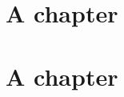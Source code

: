 \documentclass{book}
\begin{document}
\listofalgorithms %

\chapter{A chapter}
\begin{algorithm}\caption{An algorithm}\end{algorithm}
\begin{algorithm}\caption{An algorithm}\end{algorithm}

\chapter{A chapter}
\begin{algorithm}\caption{An algorithm}\end{algorithm}
\begin{algorithm}\caption{An algorithm}\end{algorithm}
\end{document}
